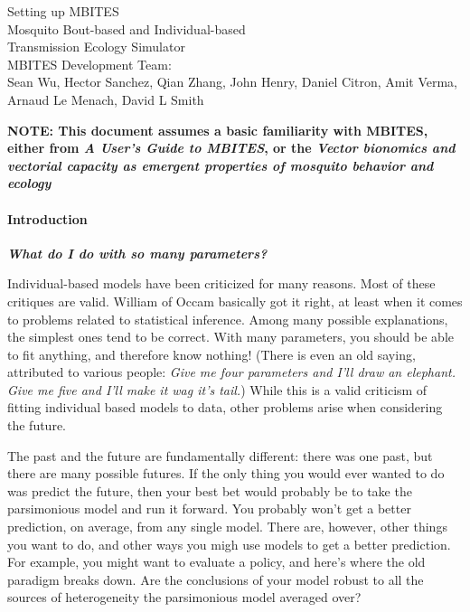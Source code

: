 \documentclass{article}
\begin{document}


\begin{centering}
\huge{Setting up MBITES}\\
\vspace{0.3in}
\Large{Mosquito Bout-based and Individual-based \\ Transmission Ecology Simulator}\\

\vspace{0.3in}
\large{MBITES Development Team: \\ Sean Wu, Hector Sanchez, Qian Zhang, John Henry, Daniel Citron, Amit Verma, Arnaud Le Menach, David L Smith\\}

\end{centering}

\vspace{0.3in}

{\bf NOTE: This document assumes a basic familiarity with MBITES, either from {\em A User's Guide to MBITES}, or the {\em Vector bionomics and vectorial capacity as emergent properties of mosquito behavior and ecology}}

\paragraph{Introduction} 

\begin{displayquote}
{\bf \em What do I do with so many parameters?}
\end{displayquote}

Individual-based models have been criticized for many reasons. Most of these critiques are valid. William of Occam basically got it right, at least when it comes to problems related to statistical inference. Among many possible explanations, the simplest ones tend to be correct. With many parameters, you should be able to fit anything, and therefore know nothing! (There is even an old saying, attributed to various people: {\em Give me four parameters and I'll draw an elephant. Give me five and I'll make it wag it's tail.})  While this is a valid criticism of fitting individual based models to data, other problems arise when considering the future.

The past and the future are fundamentally different: there was one past, but there are many possible futures.  If the only thing you would ever wanted to do was predict the future, then your best bet would probably be to take the parsimonious model and run it forward. You probably won't get a better prediction, on average, from any single model. There are, however, other things you want to do, and other ways you migh use models to get a better prediction. For example, you might want to evaluate a policy, and here's where the old paradigm breaks down. Are the conclusions of your model robust to all the sources of heterogeneity the parsimonious model averaged over?
\end{document}
